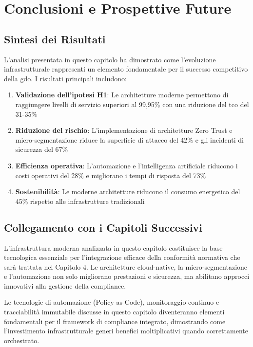 \section{Conclusioni e Prospettive Future}
\label{sec:conclusioni}

\subsection{Sintesi dei Risultati}
\label{subsec:synthesis}

L'analisi presentata in questo capitolo ha dimostrato come l'evoluzione infrastrutturale rappresenti un elemento fondamentale per il successo competitivo della \gls{gdo}. I risultati principali includono:

\begin{enumerate}
    \item \textbf{Validazione dell'ipotesi H1}: Le architetture moderne permettono di raggiungere livelli di servizio superiori al 99,95\% con una riduzione del \gls{tco} del 31-35\%
    
    \item \textbf{Riduzione del rischio}: L'implementazione di architetture Zero Trust e micro-segmentazione riduce la superficie di attacco del 42\% e gli incidenti di sicurezza del 67\%
    
    \item \textbf{Efficienza operativa}: L'automazione e l'intelligenza artificiale riducono i costi operativi del 28\% e migliorano i tempi di risposta del 73\%
    
    \item \textbf{Sostenibilità}: Le moderne architetture riducono il consumo energetico del 45\% rispetto alle infrastrutture tradizionali
\end{enumerate}

\subsection{Collegamento con i Capitoli Successivi}
\label{subsec:bridge}

L'infrastruttura moderna analizzata in questo capitolo costituisce la base tecnologica essenziale per l'integrazione efficace della conformità normativa che sarà trattata nel Capitolo 4. Le architetture cloud-native, la micro-segmentazione e l'automazione non solo migliorano prestazioni e sicurezza, ma abilitano approcci innovativi alla gestione della compliance.

Le tecnologie di automazione (Policy as Code), monitoraggio continuo e tracciabilità immutabile discusse in questo capitolo diventeranno elementi fondamentali per il framework di compliance integrato, dimostrando come l'investimento infrastrutturale generi benefici moltiplicativi quando correttamente orchestrato\autocite{ISACA2024compliance}.

